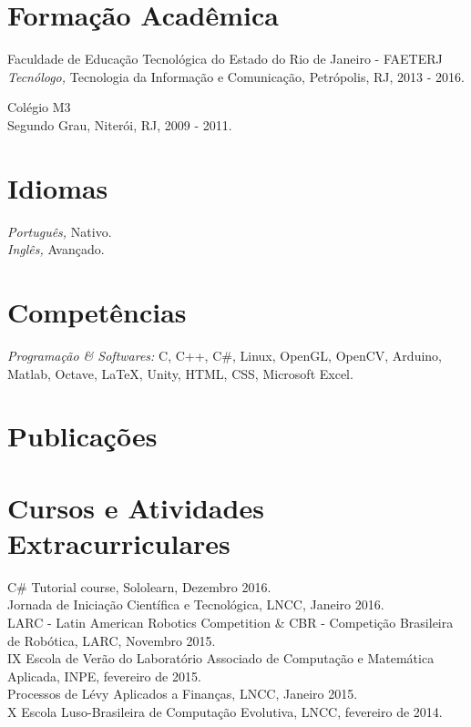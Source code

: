 \documentclass[margin, 10pt]{res} %
\begin{document}
\begin{resume}
\section{Formação Acadêmica}
Faculdade de Educação Tecnológica do Estado do Rio de Janeiro - FAETERJ \\
{\sl Tecnólogo,} Tecnologia da Informação e Comunicação, Petrópolis, RJ, 2013 - 2016.

Colégio M3 \\
Segundo Grau, Niterói, RJ, 2009 - 2011.
 

\section{Idiomas}
{\sl Português,} Nativo.\\
{\sl Inglês,} Avançado.


\section{Competências} 
{\sl Programação \& Softwares:} C, C++, C\#, Linux, OpenGL, OpenCV, Arduino, Matlab, Octave, LaTeX, Unity, HTML, CSS, Microsoft Excel.
 

\section{Publicações} 
 

\section{Cursos e Atividades Extracurriculares} 
C\# Tutorial course, Sololearn, Dezembro 2016.\\
Jornada de Iniciação Científica e Tecnológica, LNCC, Janeiro 2016.\\
LARC - Latin American Robotics Competition \& CBR - Competição Brasileira de Robótica, LARC, Novembro 2015.\\
IX Escola de Verão do Laboratório Associado de Computação e Matemática Aplicada, INPE, fevereiro de 2015.\\
Processos de Lévy Aplicados a Finanças, LNCC, Janeiro 2015.\\
X Escola Luso-Brasileira de Computação Evolutiva, LNCC, fevereiro de 2014.


\end{resume}
\end{document}
